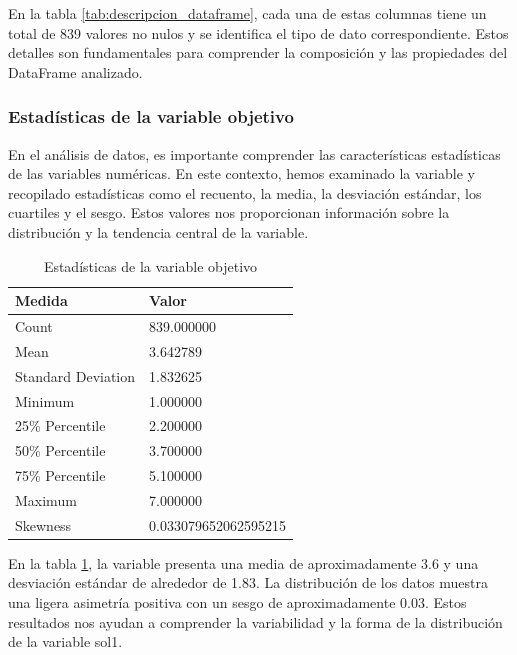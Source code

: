 En la tabla \ref{tab:descripcion_dataframe}, cada una de estas columnas tiene un total de 839 valores no nulos y se identifica el tipo de dato correspondiente. Estos detalles son fundamentales para comprender la composición y las propiedades del DataFrame analizado.

\subsubsection{Estadísticas de la variable objetivo}

En el análisis de datos, es importante comprender las características estadísticas de las variables numéricas. En este contexto, hemos examinado la variable  y recopilado estadísticas como el recuento, la media, la desviación estándar, los cuartiles y el sesgo. Estos valores nos proporcionan información sobre la distribución y la tendencia central de la variable.

\begin{table}[H]
    \centering
    \caption{Estadísticas de la variable objetivo}
    \begin{tabular}{ll}
        \hline
        \textbf{Medida}    & \textbf{Valor}       \\
        \hline
        Count              & 839.000000           \\
        Mean               & 3.642789             \\
        Standard Deviation & 1.832625             \\
        Minimum            & 1.000000             \\
        25\% Percentile    & 2.200000             \\
        50\% Percentile    & 3.700000             \\
        75\% Percentile    & 5.100000             \\
        Maximum            & 7.000000             \\
        Skewness           & 0.033079652062595215 \\
        \hline
    \end{tabular}%
    \label{tab:estadistica_variable_sol1}%
\end{table}%

En la tabla \ref{tab:estadistica_variable_sol1}, la variable  presenta una media de aproximadamente 3.6 y una desviación estándar de alrededor de 1.83. La distribución de los datos muestra una ligera asimetría positiva con un sesgo de aproximadamente 0.03. Estos resultados nos ayudan a comprender la variabilidad y la forma de la distribución de la variable sol1.

